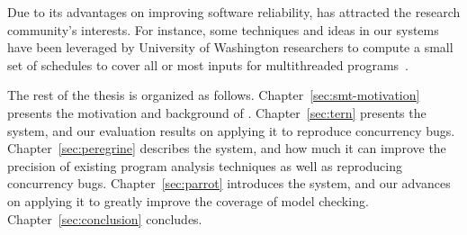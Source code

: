 Due to its advantages on improving software reliability, \smt has attracted the 
research community's interests. For instance, some techniques and ideas in our 
\smt systems have been leveraged by University of Washington researchers to 
compute a small set of schedules to cover all or most inputs for multithreaded 
programs~\cite{bergan:oopsla13}.

The rest of the thesis is organized as follows. Chapter~\ref{sec:smt-motivation}
presents the motivation and background of \smt. Chapter~\ref{sec:tern} presents
the \tern system, and our evaluation results on applying it to reproduce 
concurrency bugs. Chapter~\ref{sec:peregrine} describes the \peregrine system, 
and how much it can improve the precision of existing program analysis 
techniques as well as reproducing concurrency bugs. Chapter~\ref{sec:parrot}
introduces the \parrot system, and our advances on applying it to greatly
improve the coverage of model checking. Chapter~\ref{sec:conclusion} concludes.



